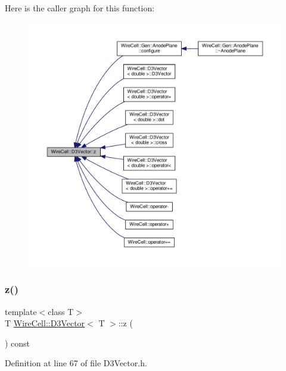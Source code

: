 Here is the caller graph for this function\+:
\nopagebreak
\begin{figure}[H]
\begin{center}
\leavevmode
\includegraphics[width=350pt]{class_wire_cell_1_1_d3_vector_aabb1a5422a461697542a6755f30b575e_icgraph}
\end{center}
\end{figure}
\mbox{\label{class_wire_cell_1_1_d3_vector_a75a340da006d17ee06a8c097fa09c25f}} 
\subsubsection{\texorpdfstring{z()}{z()}\hspace{0.1cm}{\footnotesize\ttfamily [2/2]}}
{\footnotesize\ttfamily template$<$class T$>$ \\
T \hyperlink{class_wire_cell_1_1_d3_vector}{Wire\+Cell\+::\+D3\+Vector}$<$ T $>$\+::z (\begin{DoxyParamCaption}{ }\end{DoxyParamCaption}) const\hspace{0.3cm}{\ttfamily [inline]}}



Definition at line 67 of file D3\+Vector.\+h.


